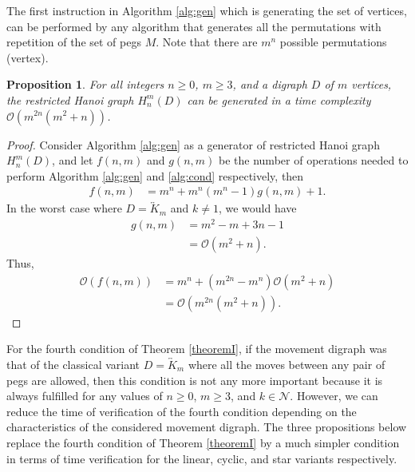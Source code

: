 \documentclass[letterpaper,11pt]{article}
\newtheorem{proposition}{Proposition}
\begin{document}
The first instruction in Algorithm \ref{alg:gen} which is generating the set of vertices, can be performed by any algorithm that generates all the permutations with repetition of the set of pegs $M$. Note that there are $m^{n}$ possible permutations (vertex). 
\begin{proposition}
     For all integers $n\geq0$, $m\geq 3$, and a digraph $D$ of $m$ vertices, the restricted Hanoi graph $H_{n}^{m}(D)$ can be generated  in a time complexity $\mathcal{O}(m^{2n}(m^{2}+n))$.
\end{proposition}
\begin{proof}
    Consider Algorithm \ref{alg:gen} as a generator of  restricted Hanoi graph $H_{n}^{m}(D)$, and let $f(n,m)$ and $g(n,m)$ be the number of operations needed to perform Algorithm \ref{alg:gen} and \ref{alg:cond} respectively, then
    \begin{align*}
        f(n,m)&=m^{n}+m^{n}(m^{n}-1)g(n,m)+1.
    \end{align*}
   In the worst case where $D=\overleftrightarrow{K}_{m}$ and $k\neq 1$, we would have
    \begin{align*}
        g(n,m)&=m^{2}-m+3n-1\\
        &=\mathcal{O}(m^{2}+n).
    \end{align*}
    Thus, 
    \begin{align*}
        \mathcal{O}(f(n,m))&=m^{n}+(m^{2n}-m^{n})\mathcal{O}(m^{2}+n)\\
        &=\mathcal{O}(m^{2n}(m^{2}+n)).
    \end{align*}
    
\end{proof}

For the fourth condition of Theorem \ref{theoremI}, if the movement digraph was that of the classical variant $D=\overleftrightarrow{K}_{m}$ where all the moves between any pair of pegs are allowed, then this condition is not any more important because it is always fulfilled for any values of $n\geq0$, $m\geq 3$, and $k\in \mathcal{N}$. However,  we can reduce the time of verification of the fourth condition depending on the characteristics of the considered movement digraph. The three propositions below replace the fourth condition of Theorem  \ref{theoremI} by a much simpler condition in terms of time verification for the linear, cyclic, and star variants respectively.
\end{document}

